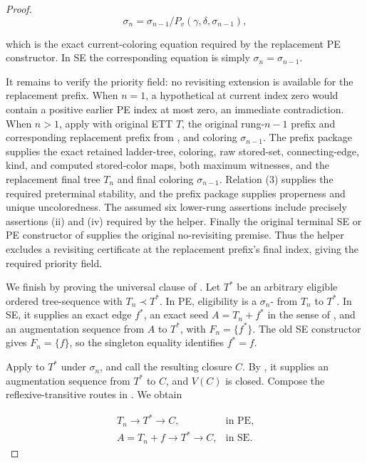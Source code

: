 \begin{proof}
\[
 \sigma_n=\sigma_{n-1}/P_v(\gamma,\delta,\sigma_{n-1}),       \tag{16}
\]

which is the exact current-coloring equation required by the replacement
PE constructor.  In SE the corresponding equation is simply
\(\sigma_n=\sigma_{n-1}\).

It remains to verify the priority field: no revisiting extension is
available for the replacement prefix.  When \(n=1\), a hypothetical
 at current index zero would
contain a positive earlier PE index at most zero, an immediate
contradiction.  When \(n>1\), apply
 with original ETT \(T\),
the original rung-\(n-1\) prefix and corresponding replacement prefix
from , and coloring
\(\sigma_{n-1}\).  The prefix package supplies the exact retained
ladder-tree, coloring, raw stored-set, connecting-edge, kind, and computed
stored-color maps, both maximum witnesses, and the replacement final
tree \(T_n\) and final coloring \(\sigma_{n-1}\).
Relation (3) supplies the required preterminal stability, and the prefix
package supplies properness and unique uncoloredness.  The assumed six
lower-rung assertions include precisely assertions (ii) and (iv) required
by the helper.  Finally the original terminal SE or PE constructor of
 supplies the original no-revisiting
premise.  Thus the helper excludes a revisiting certificate at the
replacement prefix's final index, giving the required priority field.

We finish by proving the universal clause of .  Let
\(T^*\) be an arbitrary eligible ordered tree-sequence with
\(T_n\prec T^*\).  In PE, eligibility is a
\(\sigma_n\)- from \(T_n\) to
\(T^*\).  In SE, it supplies an exact edge \(f^*\), an exact seed
\(A=T_n+f^*\) in the sense of , and an
augmentation sequence from \(A\) to \(T^*\), with
\(F_n=\{f^*\}\).  The old SE constructor gives \(F_n=\{f\}\), so the
singleton equality identifies \(f^*=f\).

Apply  to \(T^*\) under \(\sigma_n\),
and call the resulting closure \(C\).  By , it
supplies an augmentation sequence from \(T^*\) to \(C\), and
\(V(C)\) is closed.  Compose the reflexive-transitive routes in
.  We obtain

\[
 \begin{array}{ll}
 T_n\longrightarrow T^*\longrightarrow C,&\text{in PE},\\
 A=T_n+f\longrightarrow T^*\longrightarrow C,&\text{in SE}.
 \end{array}                                                  \tag{21}
\]


\end{proof}
